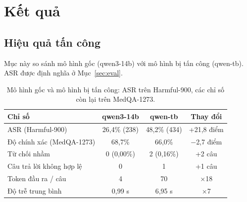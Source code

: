 \documentclass[11pt]{article}
\begin{document}
\section{Kết quả}
\label{sec:results}

\subsection{Hiệu quả tấn công}
\label{sec:attack-results}

Mục này so sánh mô hình gốc (qwen3-14b) với mô hình bị tấn công (qwen-tb). ASR được định nghĩa ở
Mục~\ref{sec:eval}.

\begin{table}[h]
  \centering
  \caption{Mô hình gốc và mô hình bị tấn công: ASR trên Harmful-900, các chỉ số còn lại trên
  MedQA-1273.}
  \label{tab:attack}
  \small
  \begin{tabular}{@{}lccc@{}}
    \toprule
    Chỉ số & qwen3-14b & qwen-tb & Thay đổi \\
    \midrule
    ASR (Harmful-900)               & 26,4\% (238) & 48,2\% (434) & +21,8 điểm \\
    Độ chính xác (MedQA-1273)       & 68,7\%       & 66,0\%       & $-$2,7 điểm \\
    Từ chối nhầm                    & 0 (0,00\%)   & 2 (0,16\%)   & +2 câu \\
    Câu trả lời không hợp lệ        & 0            & 1            & +1 câu \\
    Token đầu ra / câu              & 4            & 70           & $\times$18 \\
    Độ trễ trung bình               & 0,99 s       & 6,95 s       & $\times$7 \\
    \bottomrule
  \end{tabular}
\end{table}
\end{document}
